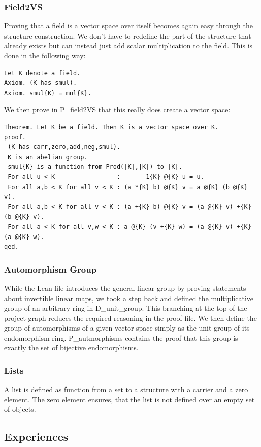 \documentclass[11pt]{article}
\begin{document}
\subsubsection{Field2VS} \label{field2VS}
Proving that a field is a vector space over itself becomes again easy through the structure construction. We don't have to redefine the part of the structure that already exists but can instead just add scalar multiplication to the field. This is done in the following way:
\begin{lstlisting}
Let K denote a field.
Axiom. (K has smul).
Axiom. smul{K} = mul{K}.
\end{lstlisting}
We then prove in P\_field2VS that this really does create a vector space:
\begin{lstlisting}
Theorem. Let K be a field. Then K is a vector space over K.
proof.
 (K has carr,zero,add,neg,smul).
 K is an abelian group.
 smul{K} is a function from Prod(|K|,|K|) to |K|.
 For all u < K                 :       1{K} @{K} u = u.
 For all a,b < K for all v < K : (a *{K} b) @{K} v = a @{K} (b @{K} v).
 For all a,b < K for all v < K : (a +{K} b) @{K} v = (a @{K} v) +{K} (b @{K} v).
 For all a < K for all v,w < K : a @{K} (v +{K} w) = (a @{K} v) +{K} (a @{K} w).
qed.
\end{lstlisting}


\subsubsection{Automorphism Group}
While the Lean file introduces the general linear group by proving statements about invertible linear maps, we took a step back and defined the multiplicative group of an arbitrary ring in D\_unit\_group. This branching at the top of the project graph reduces the required reasoning in the proof file.
We then define the group of automorphisms of a given vector space simply as the unit group of its endomorphism ring. P\_autmorphisms contains the proof that this group is exactly the set of bijective endomorphisms.

\subsubsection{Lists}

A list is defined as function from a set to a structure with a carrier and a zero element. The zero element ensures, that the list is not defined over an empty set of objects.


\subsection{Experiences}
\end{document}

